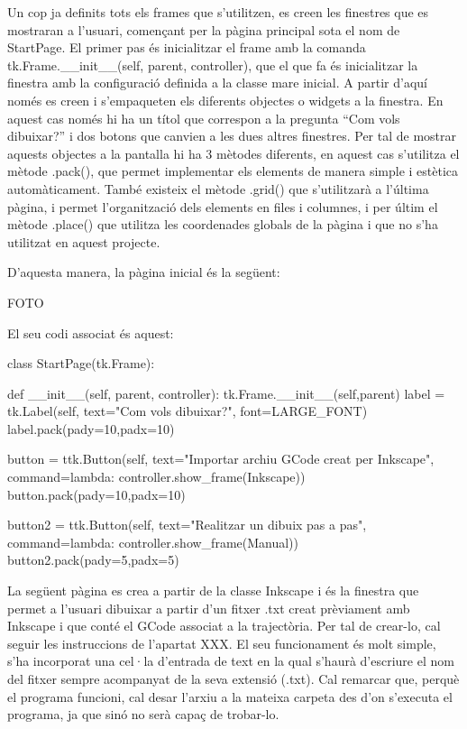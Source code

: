 Un cop ja definits tots els frames que s’utilitzen, es creen les finestres que es mostraran a l’usuari, començant per la pàgina principal sota el nom de StartPage. El primer pas és inicialitzar el frame amb la comanda tk.Frame.\_\_init\_\_(self, parent, controller), que el que fa és inicialitzar la finestra amb la configuració definida a la classe mare inicial. A partir d’aquí només es creen i s’empaqueten els diferents objectes o widgets a la finestra. En aquest cas només hi ha un títol que correspon a la pregunta “Com vols dibuixar?” i dos botons que canvien a les dues altres finestres. Per tal de mostrar aquests objectes a la pantalla hi ha 3 mètodes diferents, en aquest cas s’utilitza el mètode .pack(), que permet implementar els elements de manera simple i estètica automàticament. També existeix el mètode .grid() que s’utilitzarà a l’última pàgina, i permet l’organització dels elements en files i columnes, i per últim el mètode .place() que utilitza les coordenades globals de la pàgina i que no s’ha utilitzat en aquest projecte. 

D’aquesta manera, la pàgina inicial és la següent:

FOTO

El seu codi associat és aquest:

\begin{python}
	class StartPage(tk.Frame):
	
		def __init__(self, parent, controller):
			tk.Frame.__init__(self,parent)
			label = tk.Label(self, text="Com vols dibuixar?", font=LARGE_FONT)
			label.pack(pady=10,padx=10)
			
			button = ttk.Button(self, text="Importar archiu GCode creat per Inkscape",
			command=lambda: controller.show_frame(Inkscape))
			button.pack(pady=10,padx=10)
			
			button2 = ttk.Button(self, text="Realitzar un dibuix pas a pas",
			command=lambda: controller.show_frame(Manual))
			button2.pack(pady=5,padx=5)
\end{python}

La següent pàgina es crea a partir de la classe Inkscape i és la finestra que permet a l’usuari dibuixar a partir d’un fitxer .txt creat prèviament amb Inkscape i que conté el GCode associat a la trajectòria. Per tal de crear-lo, cal seguir les instruccions de l’apartat XXX. El seu funcionament és molt simple, s’ha incorporat una cel·la d’entrada de text en la qual s’haurà d’escriure el nom del fitxer sempre acompanyat de la seva extensió (.txt). Cal remarcar que, perquè el programa funcioni, cal desar l’arxiu a la mateixa carpeta des d’on s’executa el programa, ja que sinó no serà capaç de trobar-lo.
 
